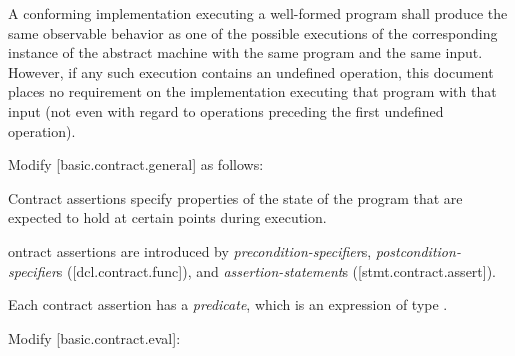 \begin{adjustwidth}{0.5cm}{0.5cm}
A conforming implementation executing a well-formed program shall produce the same observable behavior as one of the possible executions of the corresponding instance of the abstract machine with the same program and the same input. However, if any such execution contains an undefined operation, this document places no requirement on the implementation executing that program with that input (not even with regard to operations preceding the first undefined operation). 


\end{adjustwidth}

Modify [basic.contract.general] as follows:
\begin{adjustwidth}{0.5cm}{0.5cm}
Contract assertions specify properties of the state of the program that are expected to hold at certain points during execution.

ontract assertions are introduced by \emph{precondition-specifier}s, \emph{postcondition-specifier}s ([dcl.contract.func]), and \emph{assertion-statement}s ([stmt.contract.assert]). 

Each contract assertion has a \emph{predicate}, which is an expression of type .  
\end{adjustwidth}

Modify [basic.contract.eval]:

